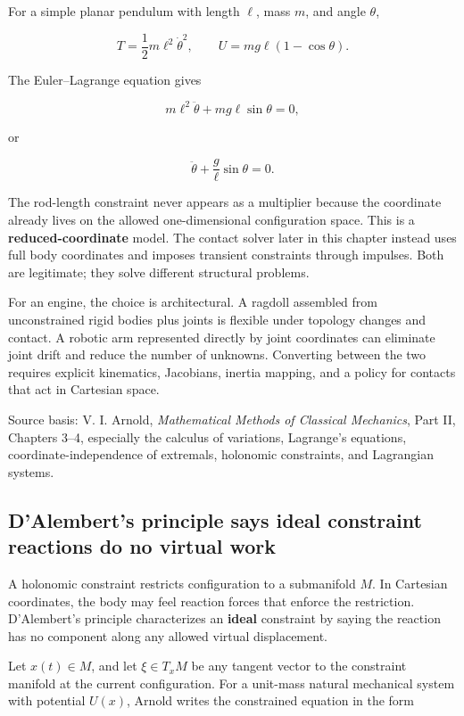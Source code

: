 For a simple planar pendulum with length \(\ell\), mass \(m\), and angle \(\theta\),

\[
T=\frac12m\ell^2\dot\theta^2,
\qquad
U=mg\ell(1-\cos\theta).
\]

The Euler--Lagrange equation gives

\[
m\ell^2\ddot\theta
+
mg\ell\sin\theta
=
0,
\]

or

\[
\ddot\theta+\frac{g}{\ell}\sin\theta=0.
\]

The rod-length constraint never appears as a multiplier because the coordinate already lives on the allowed one-dimensional configuration space. This is a \textbf{reduced-coordinate} model. The contact solver later in this chapter instead uses full body coordinates and imposes transient constraints through impulses. Both are legitimate; they solve different structural problems.

For an engine, the choice is architectural. A ragdoll assembled from unconstrained rigid bodies plus joints is flexible under topology changes and contact. A robotic arm represented directly by joint coordinates can eliminate joint drift and reduce the number of unknowns. Converting between the two requires explicit kinematics, Jacobians, inertia mapping, and a policy for contacts that act in Cartesian space.

Source basis: V. I. Arnold, \emph{Mathematical Methods of Classical Mechanics}, Part II, Chapters 3--4, especially the calculus of variations, Lagrange's equations, coordinate-independence of extremals, holonomic constraints, and Lagrangian systems.

\subsection{D'Alembert's principle says ideal constraint reactions do no virtual work}\label{06-engine-ii-ch033-dalemberts-principle-says-ideal-constraint-reactions-do-no-virtual-work}

\hypertarget{06-engine-ii-ch033-dalemberts-principle-says-ideal-constraint-reactions-do-no-virtual-work}{}

A holonomic constraint restricts configuration to a submanifold \(M\). In Cartesian coordinates, the body may feel reaction forces that enforce the restriction. D'Alembert's principle characterizes an \textbf{ideal} constraint by saying the reaction has no component along any allowed virtual displacement.

Let \(x(t)\in M\), and let \(\xi\in T_xM\) be any tangent vector to the constraint manifold at the current configuration. For a unit-mass natural mechanical system with potential \(U(x)\), Arnold writes the constrained equation in the form


